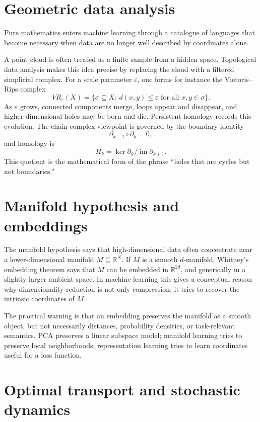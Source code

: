 \section{Geometric data analysis}

Pure mathematics enters machine learning through a catalogue of languages that become necessary when data are no longer well described by coordinates alone.

A point cloud is often treated as a finite sample from a hidden space.  Topological data analysis makes this idea precise by replacing the cloud with a filtered simplicial complex.  For a scale parameter $\varepsilon$, one forms for instance the Vietoris--Rips complex
\[
  VR_\varepsilon(X)=\{\sigma\subseteq X:\ d(x,y)\le \varepsilon\text{ for all }x,y\in \sigma\}.
\]
As $\varepsilon$ grows, connected components merge, loops appear and disappear, and higher-dimensional holes may be born and die.  Persistent homology records this evolution.  The chain complex viewpoint is governed by the boundary identity
\[
  \partial_{k-1}\circ \partial_k=0,
\]
and homology is
\[
  H_k=\ker \partial_k/\operatorname{im}\partial_{k+1}.
\]
This quotient is the mathematical form of the phrase ``holes that are cycles but not boundaries.''

\section{Manifold hypothesis and embeddings}

The manifold hypothesis says that high-dimensional data often concentrate near a lower-dimensional manifold $M\subseteq \mathbb R^N$.  If $M$ is a smooth $d$-manifold, Whitney's embedding theorem says that $M$ can be embedded in $\mathbb R^{2d}$, and generically in a slightly larger ambient space.  In machine learning this gives a conceptual reason why dimensionality reduction is not only compression: it tries to recover the intrinsic coordinates of $M$.

The practical warning is that an embedding preserves the manifold as a smooth object, but not necessarily distances, probability densities, or task-relevant semantics.  PCA preserves a linear subspace model; manifold learning tries to preserve local neighborhoods; representation learning tries to learn coordinates useful for a loss function.

\section{Optimal transport and stochastic dynamics}

